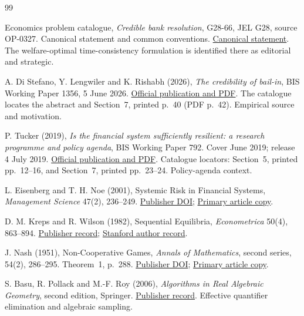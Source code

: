 \documentclass[11pt,a4paper]{article}
\numberwithin{equation}{section}
\theoremstyle{definition}
\begin{document}
\begin{thebibliography}{99}
\raggedright
{}
Economics problem catalogue, \emph{Credible bank resolution},
G28-66, JEL G28, source OP-0327. Canonical statement and common
conventions.
\href{https://github.com/mehmetmars7/Erdosproblems-llm-hunter/blob/b1f633121074e16579fa7fd05314e5f504d29bae/attacks/open_problems/economics/statements/G28-66.tex}{Canonical statement}.
The welfare-optimal time-consistency formulation is identified there
as editorial and strategic.

A. Di Stefano, Y. Lengwiler and K. Rishabh (2026),
\emph{The credibility of bail-in}, BIS Working Paper 1356,
5 June 2026.
\href{https://www.bis.org/publications/working-paper-1356-credibility-bail-in}{Official publication and PDF}.
The catalogue locates the abstract and Section~7, printed p.~40
(PDF p.~42). Empirical source and motivation.

P. Tucker (2019), \emph{Is the financial system sufficiently resilient:
a research programme and policy agenda}, BIS Working Paper 792.
Cover June 2019; release 4 July 2019.
\href{https://www.bis.org/publications/working-paper-792-financial-system-sufficiently-resilient-research-programme-and-policy-agenda}{Official publication and PDF}.
Catalogue locators: Section~5, printed pp.~12--16, and Section~7,
printed pp.~23--24. Policy-agenda context.

L. Eisenberg and T. H. Noe (2001),
Systemic Risk in Financial Systems,
\emph{Management Science} 47(2), 236--249.
\href{https://doi.org/10.1287/mnsc.47.2.236.9835}{Publisher DOI};
\href{https://ms.mcmaster.ca/tom/Research\%20Papers/EiseNoe01.pdf}{Primary article copy}.

D. M. Kreps and R. Wilson (1982),
Sequential Equilibria,
\emph{Econometrica} 50(4), 863--894.
\href{https://doi.org/10.2307/1912767}{Publisher record};
\href{https://www.gsb.stanford.edu/faculty-research/publications/sequential-equilibrium}{Stanford author record}.

J. Nash (1951), Non-Cooperative Games,
\emph{Annals of Mathematics}, second series, 54(2), 286--295.
Theorem~1, p.~288.
\href{https://doi.org/10.2307/1969529}{Publisher DOI};
\href{https://irving.vassar.edu/faculty/gj/FTU/io/literature/Nash51.pdf}{Primary article copy}.

S. Basu, R. Pollack and M.-F. Roy (2006),
\emph{Algorithms in Real Algebraic Geometry}, second edition,
Springer.
\href{https://doi.org/10.1007/3-540-33099-2}{Publisher record}.
Effective quantifier elimination and algebraic sampling.


\end{thebibliography}
\end{document}
